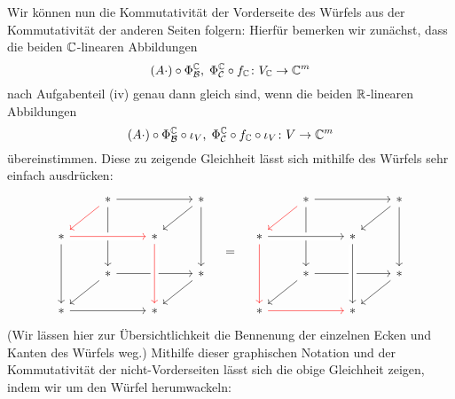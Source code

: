 \documentclass[a4paper,10pt,numbers=noenddot]{scrartcl}
\begin{document}
Wir können nun die Kommutativität der Vorderseite des Würfels aus der Kommutativität der anderen Seiten folgern:
Hierfür bemerken wir zunächst, dass die beiden $\mathbb{C}$-linearen Abbildungen
\[
  (A \cdot) \circ \Phi^{\mathbb{C}}_{\mathcal{B}}, \;
  \Phi^{\mathbb{C}}_{\mathcal{C}} \circ f_{\mathbb{C}}
  \colon
  V_{\mathbb{C}} \to \mathbb{C}^m
\]
nach Aufgabenteil (iv) genau dann gleich sind, wenn die beiden $\mathbb{R}$-linearen Abbildungen
\[
    (A \cdot) \circ \Phi^{\mathbb{C}}_{\mathcal{B}} \circ \iota_V, \;
    \Phi^{\mathbb{C}}_{\mathcal{C}} \circ f_{\mathbb{C}} \circ \iota_V
    \colon
    V \to \mathbb{C}^m
\]
übereinstimmen.
Diese zu zeigende Gleichheit lässt sich mithilfe des Würfels sehr einfach ausdrücken:
\[
  \begin{tikzcd}
      {}
    & *
      \arrow[rr]
      \arrow[ld, red]
      \arrow[dd]
    & {}
    & *
      \arrow[ld]
      \arrow[dd]
    \\
      *
      \arrow[rr, crossing over, red]
      \arrow[dd]
    & {}
    & *
      \arrow[dd]
    & {}
    \\
      {}
    & *
      \arrow[rr]
      \arrow[ld]
    & {}
    & *
      \arrow[ld]
    \\
      *
      \arrow[rr]
    & {}
    & *
      \arrow[from=uu, crossing over, red]
    & {}
  \end{tikzcd}
  \quad=\quad
  \begin{tikzcd}
      {}
    & *
      \arrow[rr]
      \arrow[ld, red]
      \arrow[dd]
    & {}
    & *
      \arrow[ld]
      \arrow[dd]
    \\
      *
      \arrow[rr, crossing over]
      \arrow[dd, red]
    & {}
    & *
      \arrow[dd]
    & {}
    \\
      {}
    & *
      \arrow[rr]
      \arrow[ld]
    & {}
    & *
      \arrow[ld]
    \\
      *
      \arrow[rr, red]
    & {}
    & *
      \arrow[from=uu, crossing over]
    & {}
  \end{tikzcd}
\]
(Wir lässen hier zur Übersichtlichkeit die Bennenung der einzelnen Ecken und Kanten des Würfels weg.)
Mithilfe dieser graphischen Notation und der Kommutativität der nicht-Vor\-der\-sei\-ten lässt sich die obige Gleichheit zeigen, indem wir um den Würfel herumwackeln:
\end{document}
